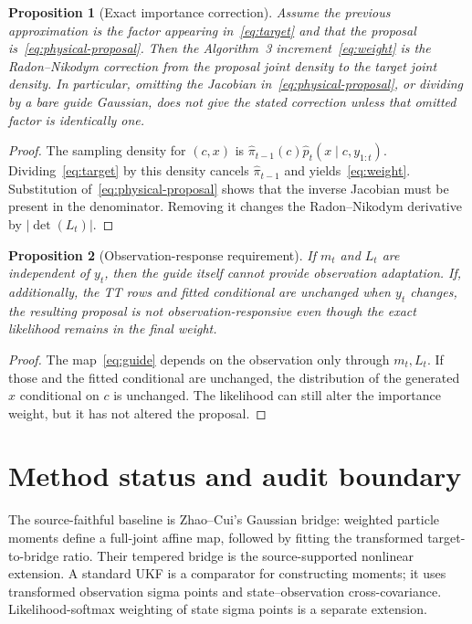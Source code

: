 \documentclass[11pt]{article}
\newtheorem{proposition}{Proposition}
\newcommand{\absdet}[1]{\left|\det\!\left(#1\right)\right|}
\begin{document}
\begin{proposition}[Exact importance correction]
\label{prop:weights}
Assume the previous approximation is the factor appearing in~\eqref{eq:target}
and that the proposal is~\eqref{eq:physical-proposal}. Then the Algorithm~3
increment~\eqref{eq:weight} is the Radon--Nikodym correction from the proposal
joint density to the target joint density. In particular, omitting the
Jacobian in~\eqref{eq:physical-proposal}, or dividing by a bare guide Gaussian,
does not give the stated correction unless that omitted factor is identically
one.
\end{proposition}
\begin{proof}
The sampling density for $(c,x)$ is
$\widehat\pi_{t-1}(c)\widehat p_t(x\mid c,y_{1:t})$. Dividing~\eqref{eq:target}
by this density cancels $\widehat\pi_{t-1}$ and yields~\eqref{eq:weight}.
Substitution of~\eqref{eq:physical-proposal} shows that the inverse Jacobian
must be present in the denominator. Removing it changes the Radon--Nikodym
derivative by $\absdet{L_t}$.
\end{proof}

\begin{proposition}[Observation-response requirement]
\label{prop:response}
If $m_t$ and $L_t$ are independent of $y_t$, then the guide itself cannot
provide observation adaptation. If, additionally, the TT rows and fitted
conditional are unchanged when $y_t$ changes, the resulting proposal is not
observation-responsive even though the exact likelihood remains in the final
weight.
\end{proposition}
\begin{proof}
The map~\eqref{eq:guide} depends on the observation only through $m_t,L_t$.
If those and the fitted conditional are unchanged, the distribution of the
generated $x$ conditional on $c$ is unchanged. The likelihood can still alter
the importance weight, but it has not altered the proposal.
\end{proof}

\section{Method status and audit boundary}
The source-faithful baseline is Zhao--Cui's Gaussian bridge: weighted particle
moments define a full-joint affine map, followed by fitting the transformed
target-to-bridge ratio. Their tempered bridge is the source-supported nonlinear
extension. A standard UKF is a comparator for constructing moments; it uses
transformed observation sigma points and state--observation cross-covariance.
Likelihood-softmax weighting of state sigma points is a separate extension.
\end{document}
